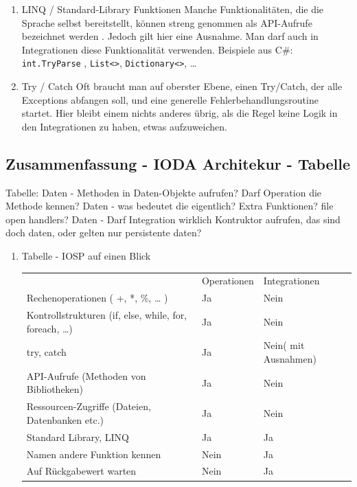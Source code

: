 \documentclass[11pt]{article}
\begin{document}
\begin{enumerate}
\item LINQ / Standard-Library Funktionen
\label{sec:orgheadline38}
Manche Funktionalitäten, die die Sprache selbst bereitstellt, können streng genommen als API-Aufrufe bezeichnet werden
. Jedoch gilt hier eine Ausnahme. Man darf auch in Integrationen diese Funktionalität verwenden.
Beispiele aus C\#:
\texttt{int.TryParse} , \texttt{List<>}, \texttt{Dictionary<>}, \ldots{}

\item Try / Catch
\label{sec:orgheadline39}
Oft braucht man auf oberster Ebene, einen Try/Catch, der alle Exceptions abfangen soll, und eine generelle Fehlerbehandlungsroutine
startet. Hier bleibt einem nichts anderes übrig, als die Regel keine Logik in den Integrationen zu haben, etwas aufzuweichen.
\end{enumerate}


\subsection{Zusammenfassung - IODA Architekur -  Tabelle}
\label{sec:orgheadline43}

Tabelle:
Daten - Methoden in Daten-Objekte aufrufen? Darf Operation die Methode kennen?
Daten - was bedeutet die eigentlich? Extra Funktionen? file open handlers?
Daten - Darf Integration wirklich Kontruktor aufrufen, das sind doch daten, oder gelten nur persistente daten?



\begin{enumerate}
\item Tabelle -  IOSP auf einen Blick
\label{sec:orgheadline42}


\begin{center}
\begin{tabular}{lll}
 & Operationen & Integrationen\\
Rechenoperationen ( +, *, \%, \ldots{} ) & Ja & Nein\\
Kontrollstrukturen (if, else, while, for, foreach, \ldots{}) & Ja & Nein\\
try, catch & Ja & Nein( mit Ausnahmen)\\
API-Aufrufe (Methoden von Bibliotheken) & Ja & Nein\\
Ressourcen-Zugriffe (Dateien, Datenbanken etc.) & Ja & Nein\\
Standard Library, LINQ & Ja & Ja\\
Namen andere Funktion kennen & Nein & Ja\\
Auf Rückgabewert warten & Nein & Ja\\
\end{tabular}
\end{center}
\end{enumerate}
\end{document}
